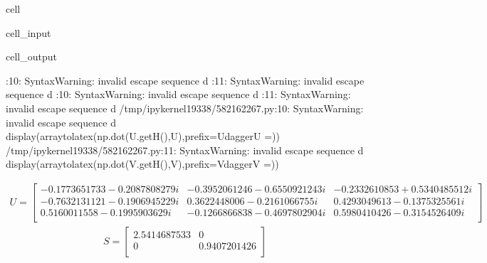 \documentclass[letterpaper,10pt,english]{jupyterBook}
\begin{document}
\begin{sphinxuseclass}{cell}
\begin{sphinxVerbatimInput}
\begin{sphinxuseclass}{cell_input}
\end{sphinxuseclass}\end{sphinxVerbatimInput}
\begin{sphinxVerbatimOutput}

\begin{sphinxuseclass}{cell_output}
\begin{sphinxVerbatim}[commandchars=\\\{\}]
\PYGZlt{}\PYGZgt{}:10: SyntaxWarning: invalid escape sequence \PYGZsq{}\PYGZbs{}d\PYGZsq{}
\PYGZlt{}\PYGZgt{}:11: SyntaxWarning: invalid escape sequence \PYGZsq{}\PYGZbs{}d\PYGZsq{}
\PYGZlt{}\PYGZgt{}:10: SyntaxWarning: invalid escape sequence \PYGZsq{}\PYGZbs{}d\PYGZsq{}
\PYGZlt{}\PYGZgt{}:11: SyntaxWarning: invalid escape sequence \PYGZsq{}\PYGZbs{}d\PYGZsq{}
/tmp/ipykernel\PYGZus{}19338/582162267.py:10: SyntaxWarning: invalid escape sequence \PYGZsq{}\PYGZbs{}d\PYGZsq{}
  display(array\PYGZus{}to\PYGZus{}latex(np.dot(U.getH(),U),prefix=\PYGZsq{}U\PYGZca{}\PYGZob{}\PYGZbs{}dagger\PYGZcb{}U =\PYGZsq{}))
/tmp/ipykernel\PYGZus{}19338/582162267.py:11: SyntaxWarning: invalid escape sequence \PYGZsq{}\PYGZbs{}d\PYGZsq{}
  display(array\PYGZus{}to\PYGZus{}latex(np.dot(V.getH(),V),prefix=\PYGZsq{}V\PYGZca{}\PYGZob{}\PYGZbs{}dagger\PYGZcb{}V =\PYGZsq{}))
\end{sphinxVerbatim}
\begin{equation*}
\begin{split}
U=
\begin{bmatrix}
-0.1773651733 - 0.2087808279 i & -0.3952061246 - 0.6550921243 i & -0.2332610853 + 0.5340485512 i  \\
 -0.7632131121 - 0.1906945229 i & 0.3622448006 - 0.2161066755 i & 0.4293049613 - 0.1375325561 i  \\
 0.5160011558 - 0.1995903629 i & -0.1266866838 - 0.4697802904 i & 0.5980410426 - 0.3154526409 i  \\
 \end{bmatrix}
\end{split}
\end{equation*}\begin{equation*}
\begin{split}
S=
\begin{bmatrix}
2.5414687533 & 0  \\
 0 & 0.9407201426  \\
 \end{bmatrix}
\end{split}
\end{equation*}\begin{equation*}

\end{equation*}
\end{sphinxuseclass}
\end{sphinxVerbatimOutput}
\end{sphinxuseclass}
\end{document}
